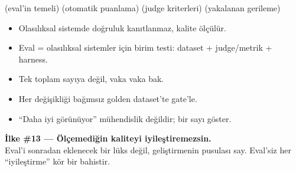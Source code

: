  (eval'in temeli) \tlsep {} (otomatik puanlama) \tlsep
{} \tlsep {} (judge kriterleri) \tlsep {} (yakalanan gerileme) \tlsep
{}

\begin{itemize}
  \item Olasılıksal sistemde doğruluk kanıtlanmaz, kalite ölçülür.
  \item Eval = olasılıksal sistemler için birim testi: dataset + judge/metrik + harness.
  \item Tek toplam sayıya değil, vaka vaka bak.
  \item Her değişikliği bağımsız golden dataset'te gate'le.
  \item ``Daha iyi görünüyor'' mühendislik değildir; bir sayı göster.
\end{itemize}

\begin{principlebox}
\textbf{İlke \#13 — Ölçemediğin kaliteyi iyileştiremezsin.}\\[4pt]
\normalsize Eval'i sonradan eklenecek bir lüks değil, geliştirmenin pusulası say.
Eval'siz her ``iyileştirme'' kör bir bahistir.
\end{principlebox}
